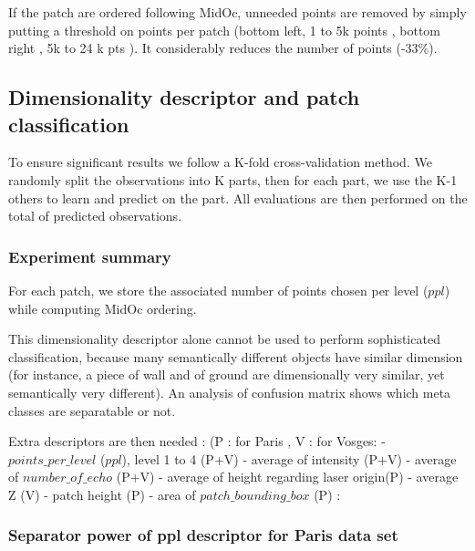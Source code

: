 		If the patch are ordered following MidOc, unneeded points are removed by simply putting a threshold on points per patch (bottom left, 1 to 5k points \per \cubic \meter , bottom right , 5k to 24 k pts \per \cubic \meter). It considerably reduces the number of points (-33\%).
			
	\subsection{Dimensionality descriptor and patch classification}
			To ensure significant results we follow a K-fold cross-validation method. 
			We randomly split the observations into K parts, then for each part, we use the K-1 others to learn and predict on the part.
			All evaluations are then performed on the total of predicted observations.
		\subsubsection{Experiment summary}
			For each patch, we store the associated number of points chosen per level ($ppl$) while computing MidOc ordering.  
			
			This dimensionality descriptor alone cannot be used to perform sophisticated classification, because many semantically different objects have similar dimension (for instance, a piece of wall and of ground are dimensionally very similar, yet semantically very different).
			An analysis of confusion matrix shows which meta classes are separatable or not.
			
			Extra descriptors are then needed :  (P : for Paris , V : for Vosges: 
		- $points\_per\_level$ ($ppl$), level 1 to 4 (P+V)
		- average of intensity (P+V)
		- average of $number\_of\_echo$ (P+V)
		- average of height regarding laser origin(P)
		- average Z (V)
		- patch height (P)
		- area of $patch\_bounding\_box$ (P) : 
		
		\subsubsection{Separator power of ppl descriptor for Paris data set}
			
			
